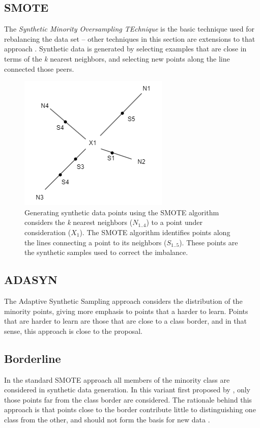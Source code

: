 \documentclass[letterpaper]{article}
\begin{document}
{\subsection{SMOTE}
The \textit{Synthetic Minority Oversampling TEchnique} is the basic technique used for rebalancing the data set -- other techniques in this section are extensions to that approach \parencite{Chawla2002-dk}. Synthetic data is generated by selecting examples that are close in terms of the \textit{k} nearest neighbors, and selecting new points along the line connected those peers.
\begin{figure}[H]
	\centering
	\includegraphics[scale=0.35]{./figures/smote.png}
	\caption[SMOTE selection of synthetic data points]{Generating synthetic data points using the SMOTE algorithm considers the \textit{k} nearest neighbors ($N_{1..4}$) to a point under consideration ($X_1$).  The SMOTE algorithm identifies points along the lines connecting a point to its neighbors ($S_{1..5}$). These points are the synthetic samples used to correct the imbalance.}
	\label{fig:smote}
\end{figure}

\subsection{ADASYN}
The Adaptive Synthetic Sampling approach considers the distribution of the minority points, giving more emphasis to points that a harder to learn. \parencite{He2008-xr} Points that are harder to learn are those that are close to a class border, and in that sense, this approach is close to the  proposal.

\subsection{Borderline}
In the standard SMOTE approach all members of the minority class are considered in synthetic data generation. In this variant first proposed by \citeauthor{Han2005-ui}, only those points far from the class border are considered. The rationale behind this approach is that points close to the border contribute little to distinguishing one class from the other, and should not form the basis for new data \parencite{Han2005-ui}.
%
%


}
\end{document}
